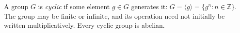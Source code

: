 
A group $G$ is \emph{cyclic} if some element $g\in G$ generates it: $G=\langle g\rangle=\{g^n:n\in\mathbb Z\}$. The group may be finite or infinite, and its operation need not initially be written multiplicatively. Every cyclic group is abelian.
